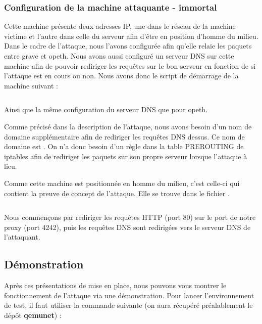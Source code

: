 \inputminted[bgcolor=lbcolor, breaklines]{shell}{../sslstrip2/opeth/start.sh}

\subsubsection{Configuration de la machine attaquante - immortal}

Cette machine présente deux adresses IP, une dans le réseau de la machine victime et l'autre dans celle du serveur afin d'être en position d'homme du milieu. Dans le cadre de l'attaque, nous l'avons configurée afin qu'elle relaie les paquets entre grave et opeth. Nous avons aussi configuré un serveur DNS sur cette machine afin de pouvoir rediriger les requêtes sur le bon serveur en fonction de si l'attaque est en cours ou non. Nous avons donc le script de démarrage de la machine suivant :

\inputminted[bgcolor=lbcolor, breaklines]{shell}{../sslstrip2/immortal/start.sh}

Ainsi que la même configuration du serveur DNS que pour opeth.

Comme précisé dans la description de l'attaque, nous avons besoin d'un nom de domaine supplémentaire afin de rediriger les requêtes DNS dessus. Ce nom de domaine est . On n'a donc besoin d'un règle dans la table PREROUTING de iptables afin de rediriger les paquets sur son propre serveur lorsque l'attaque à lieu.

Comme cette machine est positionnée en homme du milieu, c'est celle-ci qui contient la preuve de concept de l'attaque. Elle se trouve dans le fichier .

\inputminted[bgcolor=lbcolor, breaklines]{shell}{../sslstrip2/immortal/attack.sh}

Nous commençons par rediriger les requêtes HTTP (port 80) sur le port de notre proxy (port 4242), puis les requêtes DNS sont redirigées vers le serveur DNS de l'attaquant.

\subsection{Démonstration}

Après ces présentations de mise en place, nous pouvons vous montrer le fonctionnement de l'attaque via une démonstration. Pour lancer l'environnement de test, il faut utiliser la commande suivante (on aura récupéré préalablement le dépôt \textbf{qemunet}) :

